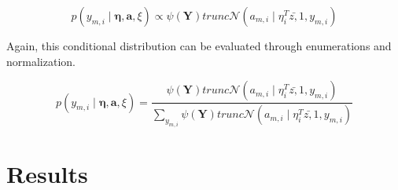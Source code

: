 \documentclass{article}
\begin{document}
\begin{equation}
p\left(y_{m,i}\mid\mathbf{\eta},\mathbf{a},\xi\right)\propto\psi\left(\mathbf{Y}\right)trunc\mathcal{N}\left(a_{m,i}\mid\eta_{i}^{T}\bar{z,}1,y_{m,i}\right)\end{equation}


Again, this conditional distribution can be evaluated through enumerations
and normalization.

\begin{equation}
p\left(y_{m,i}\mid\mathbf{\eta},\mathbf{a},\xi\right)=\frac{\psi\left(\mathbf{Y}\right)trunc\mathcal{N}\left(a_{m,i}\mid\eta_{i}^{T}\bar{z,}1,y_{m,i}\right)}{\sum_{y_{m,i}}\psi\left(\mathbf{Y}\right)trunc\mathcal{N}\left(a_{m,i}\mid\eta_{i}^{T}\bar{z,}1,y_{m,i}\right)}\end{equation}



\section{Results}









\end{document}
